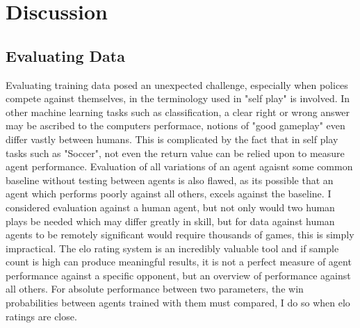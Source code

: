 \chapter{Discussion}\label{chap:discussion}
\section{Evaluating Data}\label{sec:disc:evaluation}
Evaluating training data posed an unexpected challenge, especially when polices compete against themselves, in the terminology used in \cite{juliani2020unity} "self play" is involved. In other machine learning tasks such as classification, a clear right or wrong answer may be ascribed to the computers performace, notions of "good gameplay" even differ vastly between humans. This is complicated by the fact that in self play tasks such as "Soccer", not even the return value can be relied upon to measure agent performance. Evaluation of all variations of an agent agaisnt some common baseline without testing between agents is also flawed, as its possible that an agent which performs poorly against all others, excels against the baseline. I considered evaluation against a human agent, but not only would two human plays be needed which may differ greatly in skill, but for data against human agents to be remotely significant would require thousands of games, this is simply impractical. The elo rating system is an incredibly valuable tool and if sample count is high can produce meaningful results, it is not a perfect measure of agent performance against a specific opponent, but an overview of performance against all others. For absolute performance between two parameters, the win probabilities between agents trained with them must compared, I do so when elo ratings are close.



